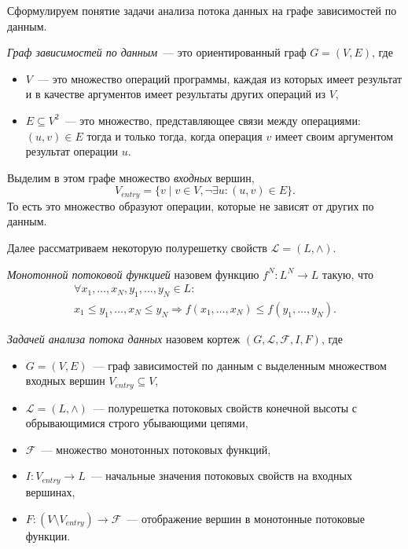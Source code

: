 \documentclass[14pt,titlepage,draft]{extarticle}
\newcommand{\Lattice}{\mathcal{L}}
\newcommand{\meet}{\wedge}
\begin{document}
    Сформулируем понятие задачи анализа потока данных на графе зависимостей по
    данным.

    \emph{Граф зависимостей по данным}~--- это ориентированный граф
    $G = (V, E)$, где
    \begin{itemize}
      \item $V$~--- это множество операций программы, каждая из которых имеет
            результат и в качестве аргументов имеет результаты других операций
            из $V$,
      \item $E \subseteq V^2$~--- это множество, представляющее связи между
            операциями: $(u, v) \in E$ тогда и только тогда, когда операция $v$
            имеет своим аргументом результат операции $u$.
    \end{itemize}

    Выделим в этом графе множество \emph{входных} вершин,
    \[ V_{entry} = \{ v \mid v \in V, \lnot \exists u\colon (u, v) \in E \}. \]
    То есть это множество образуют операции, которые не зависят от других по
    данным.

    Далее рассматриваем некоторую полурешетку свойств $\Lattice = (L, \meet)$.

    \emph{Монотонной потоковой функцией} назовем функцию $f^N \colon L^N \to L$
    такую, что
    \begin{multline*}
      \forall x_1, \ldots, x_N, y_1, \ldots, y_N \in L \colon \\
        x_1 \leq y_1, \ldots, x_N \leq y_N \Rightarrow
        f(x_1, \ldots, x_N) \leq f(y_1, \ldots, y_N).
    \end{multline*}

    \emph{Задачей анализа потока данных} назовем кортеж $(G, \Lattice,
    \mathcal{F}, I, F)$, где
    \begin{itemize}
      \item $G = (V, E)$~--- граф зависимостей по данным с выделенным
            множеством входных вершин $V_{entry} \subseteq V$,
      \item $\Lattice = (L, \meet)$~--- полурешетка потоковых свойств конечной
            высоты с обрывающимися строго убывающими цепями,
      \item $\mathcal{F}$~--- множество монотонных потоковых функций,
      \item $I\colon V_{entry} \to L$~--- начальные значения потоковых свойств
            на входных вершинах,
      \item $F\colon (V \setminus V_{entry}) \to \mathcal{F}$~--- отображение
            вершин в монотонные потоковые функции.
    \end{itemize}
\end{document}
